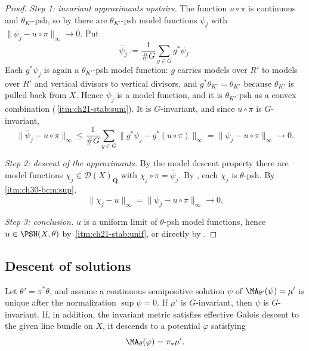 \begin{proof}
\emph{Step 1: invariant approximants upstairs.}  The function
\(u\circ\pi\) is continuous and \(\theta_{K'}\)-psh, so by
 there are \(\theta_{K'}\)-psh model
functions \(\psi_j\) with
\(\lVert\psi_j-u\circ\pi\rVert_\infty\to0\).  Put
\[
 \overline\psi_j:=\frac1{\#G}\sum_{g\in G}g^*\psi_j .
\]
Each \(g^*\psi_j\) is again a \(\theta_{K'}\)-psh model function: \(g\)
carries models over \(R'\) to models over \(R'\) and vertical divisors to
vertical divisors, and \(g^*\theta_{K'}=\theta_{K'}\) because
\(\theta_{K'}\) is pulled back from \(X\).  Hence \(\overline\psi_j\) is a
model function, and it is \(\theta_{K'}\)-psh as a convex combination
(\,\cref{itm:ch21-stab:sum}).  It is
\(G\)-invariant, and since \(u\circ\pi\) is \(G\)-invariant,
\[
 \lVert\overline\psi_j-u\circ\pi\rVert_\infty
 \leq\frac1{\#G}\sum_{g\in G}
   \lVert g^*\psi_j-g^*(u\circ\pi)\rVert_\infty
 =\lVert\psi_j-u\circ\pi\rVert_\infty\longrightarrow0 .
\]

\emph{Step 2: descent of the approximants.}  By the model descent property
there are model functions \(\chi_j\in\mathcal D(X)_{\mathbf Q}\) with
\(\chi_j\circ\pi=\overline\psi_j\).  By
, each \(\chi_j\) is \(\theta\)-psh.  By
\,\cref{itm:ch30-bcm:sup},
\[
 \lVert\chi_j-u\rVert_\infty
 =\lVert\overline\psi_j-u\circ\pi\rVert_\infty\longrightarrow0 .
\]

\emph{Step 3: conclusion.}  \(u\) is a uniform limit of \(\theta\)-psh
model functions, hence \(u\in\PSH(X,\theta)\) by
\,\cref{itm:ch21-stab:unif}, or directly by
.
\end{proof}

\subsection{Descent of solutions}
\label{sec:ch30-descent-solutions}

\begin{proposition}\label{prop:galois-descent-potentials}
Let \(\theta'=\pi^*\theta\), and assume a continuous semipositive solution
\(\psi\) of
\(\MA_{\theta'}(\psi)=\mu'\) is unique after the normalization
\(\sup\psi=0\).  If \(\mu'\) is \(G\)-invariant, then \(\psi\) is
\(G\)-invariant.  If, in addition, the invariant metric satisfies effective
Galois descent to the given line bundle on \(X\), it descends to a potential
\(\varphi\) satisfying
\[
                       \MA_\theta(\varphi)=\pi_*\mu'.
\]
\end{proposition}

